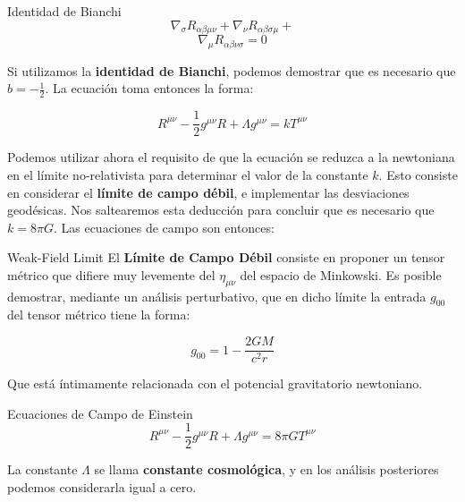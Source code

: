 \begin{marginfigure}
\begin{remarkbox}{Identidad de Bianchi}
$$\nabla_\sigma R_{\alpha\beta\mu\nu}+\nabla_\nu R_{\alpha\beta\sigma\mu}+$$ $$\nabla_\mu R_{\alpha\beta\nu\sigma}=0$$
\end{remarkbox}
\end{marginfigure}

Si utilizamos la \textbf{identidad de Bianchi}, podemos demostrar que es necesario que $b=-\frac{1}{2}$. La ecuación toma entonces la forma:

\begin{equation}
    R^{\mu\nu}-\frac{1}{2} g^{\mu\nu} R+\Lambda g^{\mu\nu}=k T^{\mu\nu}
\end{equation}

Podemos utilizar ahora el requisito de que la ecuación se reduzca a la newtoniana en el límite no-relativista para determinar el valor de la constante $k$. Esto consiste en considerar el \textbf{límite de campo débil}\cite[][p.255]{moore}, e implementar las desviaciones geodésicas. Nos saltearemos esta deducción\cite[][p.246]{moore} para concluir que es necesario que $k=8\pi G$. Las ecuaciones de campo son entonces:

\begin{marginfigure}
\begin{remarkbox}{Weak-Field Limit}
El \textbf{Límite de Campo Débil} consiste en proponer un tensor métrico que difiere muy levemente del $\eta_{\mu\nu}$ del espacio de Minkowski. Es posible demostrar, mediante un análisis perturbativo, que en dicho límite la entrada $g_{00}$ del tensor métrico tiene la forma:

\begin{equation}
    g_{00}=1-\frac{2GM}{c^2 r}
    \label{g00}
\end{equation}

Que está íntimamente relacionada con el potencial gravitatorio newtoniano.
\end{remarkbox}
\end{marginfigure}

\begin{remarkbox}{Ecuaciones de Campo de Einstein}
\begin{equation}
    R^{\mu\nu}-\frac{1}{2} g^{\mu\nu} R+\Lambda g^{\mu\nu}=8 \pi G T^{\mu\nu}
\end{equation}
\end{remarkbox}

La constante $\Lambda$ se llama \textbf{constante cosmológica}, y en los análisis posteriores podemos considerarla igual a cero.

